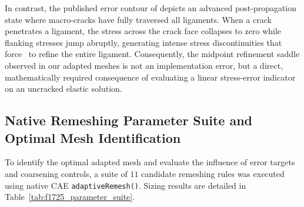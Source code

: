 In contrast, the published error contour of \citet[Fig.~25a]{pandey2025} depicts an advanced post-propagation state where macro-cracks have fully traversed all ligaments. When a crack penetrates a ligament, the stress across the crack face collapses to zero while flanking stresses jump abruptly, generating intense stress discontinuities that force \MISESERI\ to refine the entire ligament. Consequently, the midpoint refinement saddle observed in our adapted meshes is not an implementation error, but a direct, mathematically required consequence of evaluating a linear stress-error indicator on an uncracked elastic solution.

\subsection{Native Remeshing Parameter Suite and Optimal Mesh Identification}
\label{subsec:f1725_mesh_suite}

To identify the optimal adapted mesh and evaluate the influence of error targets and coarsening controls, a suite of $11$ candidate remeshing rules was executed using native \Abaqus CAE \texttt{adaptiveRemesh()}. Sizing results are detailed in Table~\ref{tab:f1725_parameter_suite}.

